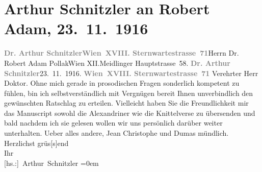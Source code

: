 

         
         \renewcommand{\erwaehntePersonen}{Personen: Robert Adam, Alexandre père Dumas}
         \renewcommand{\erwaehnteOrte}{Orte: Meidlinger Hauptstraße, Sternwartestraße, Wien, XII., Meidling}
         \renewcommand{\erwaehnteWerke}{Werke: Jean Christophe, Meine Memoiren, Wundervogel}
               \section[Arthur Schnitzler an Robert Adam, 23. 11. 1916]{ Arthur Schnitzler an Robert Adam, 23. 11. 1916}\nopagebreak{}\rehead{ }\begin{ledgroupsized}[t]{13cm}\normalsize\beginnumbering \toendnotes[C]{\smallbreak\pagebreak[2]} 
\toendnotes[C]{\smallbreak}\pstart{}{\pb}\textcolor{gray}{\textbf{Dr. Arthur Schnitzler}}\pend{}\pstart{}\textcolor{gray}{\textbf{Wien XVIII. Sternwartestrasse 71}}\pend{}{\bigskip}\pstart{}{\pb}Herrn Dr. Robert Adam Pollak\pend{}\pstart{}Wien XII.\pend{}\pstart{}Meidlinger Hauptstrasse 58.\pend{}{\bigskip}\pstart
           \noindent{}{\pb}\textcolor{gray}{\textbf{Dr. Arthur Schnitzler}}\hfill 23. 11. 1916.\pend
           \pstart
           \textcolor{gray}{\textbf{Wien XVIII. Sternwartestrasse 71}}\pend
           \pstart\center{}Verehrter Herr Doktor.\pend\pstart
           Ohne mich gerade in prosodischen Fragen sonderlich kompetent zu fühlen, bin ich
               selbstverständlich mit Vergnügen bereit Ihnen unverbindlich den gewünschten Ratschlag
               zu erteilen. Vielleicht haben Sie die Freundlichkeit mir das Manuscript sowohl die Alexandriner wie die
               Knittelverse zu übersenden und bald nachdem ich sie gelesen wollen wir uns persönlich
               darüber weiter unterhalten. Ueber alles andere, Jean
                  Christophe und Dumas mündlich.\pend
           \pstart
           Herzlichst grüs{[}s{]}end{\\[\baselineskip]}Ihr{\\[\baselineskip]}\spacefill\mbox{{[}hs.:{]} Arthur Schnitzler}\pend
           \leftskip=0em{}
         

\end{ledgroupsized}
